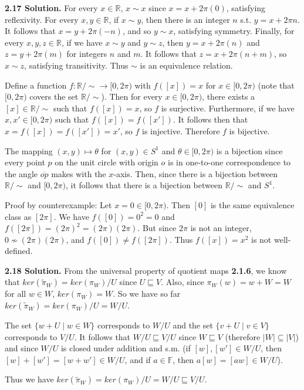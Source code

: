 \textbf{2.17 Solution.} For every $x\in\mathbb{R}$, $x\sim x$ since $x=x+2\pi(0)$, satisfying reflexivity. For every $x,y\in\mathbb{R}$, if $x\sim y$, then there is an integer $n$ s.t. $y=x+2\pi n$. It follows that $x=y+2\pi(-n)$, and so $y\sim x$, satisfying symmetry. Finally, for every $x,y,z\in\mathbb{R}$, if we have $x\sim y$ and $y\sim z$, then $y=x+2\pi(n)$ and $z=y+2\pi(m)$ for integers $n$ and $m$. It follows that $z=x+2\pi(n+m)$, so $x\sim z$, satisfying transitivity. Thus $\sim$ is an equivalence relation.

Define a function $f:\mathbb{R}/\sim\to[0,2\pi)$ with $f([x])=x$ for $x\in[0,2\pi)$ (note that $[0,2\pi)$ covers the set $\mathbb{R}/\sim$). Then for every $x\in[0,2\pi)$, there exists a $[x]\in\mathbb{R}/\sim$ such that $f([x])=x$, so $f$ is surjective. Furthermore, if we have $x,x'\in[0,2\pi)$ such that $f([x])=f([x'])$. It follows then that $x=f([x])=f([x'])=x'$, so $f$ is injective. Therefore $f$ is bijective.

The mapping $(x,y)\mapsto\theta$ for $(x,y)\in S^1$ and $\theta\in[0,2\pi)$ is a bijection since every point $p$ on the unit circle with origin $o$ is in one-to-one correspondence to the angle $\overline{op}$ makes with the $x$-axis. Then, since there is a bijection between $\mathbb{R}/\sim$ and $[0,2\pi)$, it follows that there is a bijection between $\mathbb{R}/\sim$ and $S^1$.

Proof by counterexample: Let $x=0\in[0,2\pi)$. Then $[0]$ is the same equivalence class as $[2\pi]$. We have $f([0])=0^2=0$ and $f([2\pi])=(2\pi)^2=(2\pi)(2\pi)$. But since $2\pi$ is not an integer, $0\not\sim (2\pi)(2\pi)$, and $f([0])\neq f([2\pi])$. Thus $f([x])=x^2$ is not well-defined.

\textbf{2.18 Solution.} From the universal property of quotient maps \textbf{2.1.6}, we know that $ker(\widetilde{\pi}_W) = ker(\pi_W)/U$ since $U\sqsubseteq V$. Also, since $\pi_W(w) = w+W = W$ for all $w\in W$, $ker(\pi_W) = W$. So we have so far $ker(\widetilde{\pi}_W) = ker(\pi_W)/U = W/U$.

The set $\{w+U\mid w\in W\}$ corresponds to $W/U$ and the set $\{v+U\mid v\in V\}$ corresponds to $V/U$. It follows that $W/U\sqsubseteq V/U$ since $W\sqsubseteq V$ (therefore $|W|\subseteq|V|$) and since $W/U$ is closed under addition and s.m. (if $[w],[w']\in W/U$, then $[w]+[w']=[w+w']\in W/U$, and if $a\in\mathbb{F}$, then $a[w]=[aw]\in W/U$).

Thus we have $ker(\widetilde{\pi}_W) = ker(\pi_W)/U = W/U \sqsubseteq V/U$.

